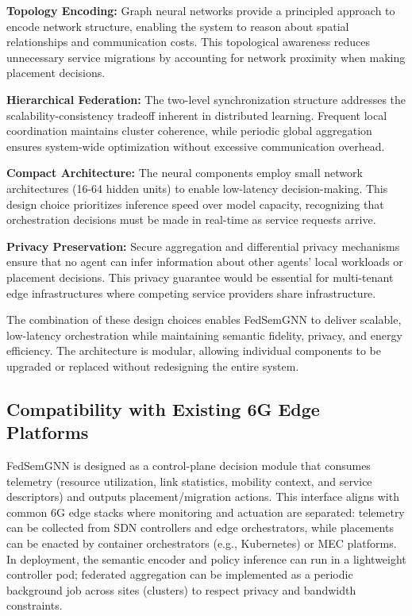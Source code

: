 \documentclass[conference]{IEEEtran}
\begin{document}
	\textbf{Topology Encoding:} Graph neural networks provide a principled approach to encode network structure, enabling the system to reason about spatial relationships and communication costs. This topological awareness reduces unnecessary service migrations by accounting for network proximity when making placement decisions.
	
	\textbf{Hierarchical Federation:} The two-level synchronization structure addresses the scalability-consistency tradeoff inherent in distributed learning. Frequent local coordination maintains cluster coherence, while periodic global aggregation ensures system-wide optimization without excessive communication overhead.
	
	\textbf{Compact Architecture:} The neural components employ small network architectures (16-64 hidden units) to enable low-latency decision-making. This design choice prioritizes inference speed over model capacity, recognizing that orchestration decisions must be made in real-time as service requests arrive.
	
	\textbf{Privacy Preservation:} Secure aggregation and differential privacy mechanisms ensure that no agent can infer information about other agents' local workloads or placement decisions. This privacy guarantee would be essential for multi-tenant edge infrastructures where competing service providers share infrastructure.
	
	The combination of these design choices enables FedSemGNN to deliver scalable, low-latency orchestration while maintaining semantic fidelity, privacy, and energy efficiency. The architecture is modular, allowing individual components to be upgraded or replaced without redesigning the entire system.
	
	\subsection{Compatibility with Existing 6G Edge Platforms}
	FedSemGNN is designed as a control-plane decision module that consumes telemetry (resource utilization, link statistics, mobility context, and service descriptors) and outputs placement/migration actions. This interface aligns with common 6G edge stacks where monitoring and actuation are separated: telemetry can be collected from SDN controllers and edge orchestrators, while placements can be enacted by container orchestrators (e.g., Kubernetes) or MEC platforms. In deployment, the semantic encoder and policy inference can run in a lightweight controller pod; federated aggregation can be implemented as a periodic background job across sites (clusters) to respect privacy and bandwidth constraints.
	
\end{document}
